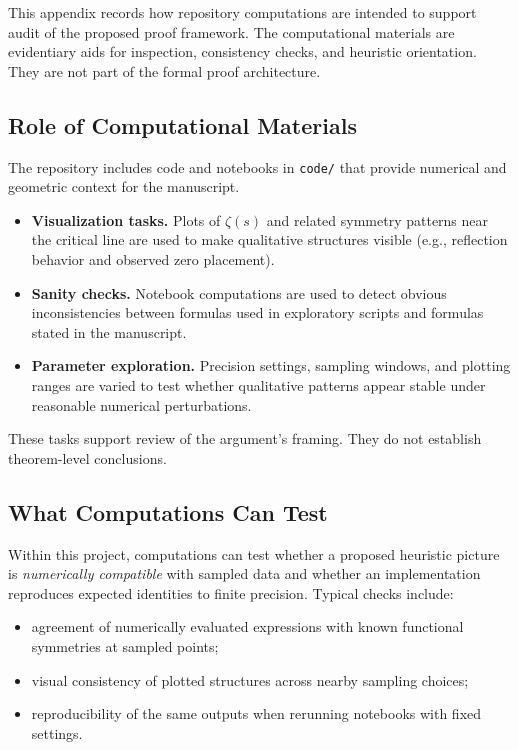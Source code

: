 This appendix records how repository computations are intended to support audit of the proposed proof framework. The computational materials are evidentiary aids for inspection, consistency checks, and heuristic orientation. They are not part of the formal proof architecture.

\subsection{Role of Computational Materials}

The repository includes code and notebooks in \texttt{code/} that provide numerical and geometric context for the manuscript.

\begin{itemize}
  \item \textbf{Visualization tasks.} Plots of $\zeta(s)$ and related symmetry patterns near the critical line are used to make qualitative structures visible (e.g., reflection behavior and observed zero placement).
  \item \textbf{Sanity checks.} Notebook computations are used to detect obvious inconsistencies between formulas used in exploratory scripts and formulas stated in the manuscript.
  \item \textbf{Parameter exploration.} Precision settings, sampling windows, and plotting ranges are varied to test whether qualitative patterns appear stable under reasonable numerical perturbations.
\end{itemize}

These tasks support review of the argument's framing. They do not establish theorem-level conclusions.

\subsection{What Computations Can Test}

Within this project, computations can test whether a proposed heuristic picture is \emph{numerically compatible} with sampled data and whether an implementation reproduces expected identities to finite precision. Typical checks include:

\begin{itemize}
  \item agreement of numerically evaluated expressions with known functional symmetries at sampled points;
  \item visual consistency of plotted structures across nearby sampling choices;
  \item reproducibility of the same outputs when rerunning notebooks with fixed settings.
\end{itemize}

